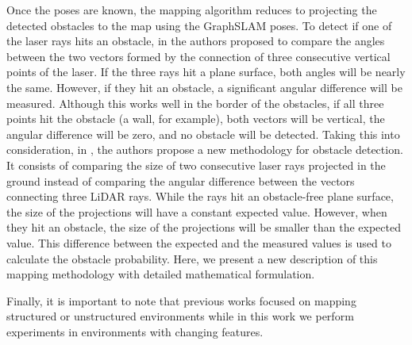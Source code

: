 Once the poses are known, the mapping algorithm reduces to projecting the detected obstacles to the map using the GraphSLAM poses. To detect if one of the laser rays hits an obstacle, in \cite{47leonard2008perception} the authors proposed to compare the angles between the two vectors formed by the connection of three consecutive vertical points of the laser. If the three rays hit a plane surface, both angles will be nearly the same. However, if they hit an obstacle, a significant angular difference will be measured. Although this works well in the border of the obstacles, if all three points hit the obstacle (a wall, for example), both vectors will be vertical, the angular difference will be zero, and no obstacle will be detected. Taking this into consideration, in \cite{22montemerlo2008junior}, the authors propose a new methodology for obstacle detection. It consists of comparing the size of two consecutive laser rays projected in the ground instead of comparing the angular difference between the vectors connecting three LiDAR rays. While the rays hit an obstacle-free plane surface, the size of the projections will have a constant expected value. However, when they hit an obstacle, the size of the projections will be smaller than the expected value. This difference between the expected and the measured values is used to calculate the obstacle probability. Here, we present a new description of this mapping methodology with detailed mathematical formulation.

Finally, it is important to note that previous works focused on mapping structured or unstructured environments while in this work we perform experiments in environments with changing features. 
